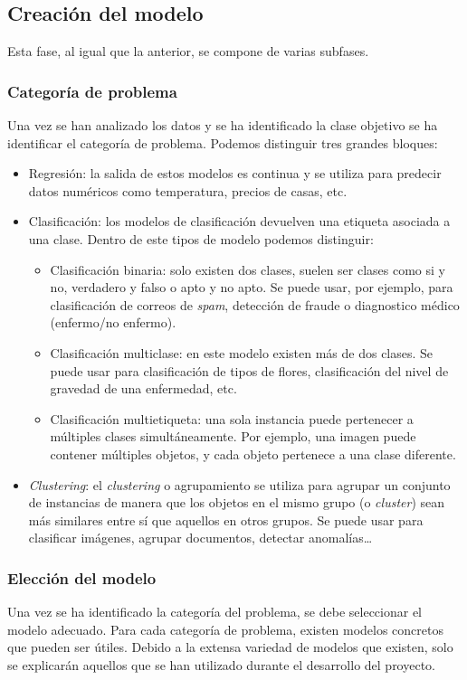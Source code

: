\subsection{Creación del modelo}

Esta fase, al igual que la anterior, se compone de varias subfases.

\subsubsection{Categoría de problema}

Una vez se han analizado los datos y se ha identificado la clase objetivo se ha identificar el categoría de problema. Podemos distinguir tres grandes bloques:
\begin{itemize}
\item Regresión: la salida de estos modelos es continua y se utiliza para predecir datos numéricos como temperatura, precios de casas, etc.
\item Clasificación: los modelos de clasificación devuelven una etiqueta asociada a una clase. Dentro de este tipos de modelo podemos distinguir:
\begin{itemize}
\item Clasificación binaria: solo existen dos clases, suelen ser clases como si y no, verdadero y falso o apto y no apto. Se puede usar, por ejemplo, para clasificación de correos de \textit{spam}, detección de fraude o diagnostico médico (enfermo/no enfermo).
\item Clasificación multiclase: en este modelo existen más de dos clases. Se puede usar para clasificación de tipos de flores, clasificación del nivel de gravedad de una enfermedad, etc.
\item Clasificación multietiqueta: una sola instancia puede pertenecer a múltiples clases simultáneamente. Por ejemplo, una imagen puede contener múltiples objetos, y cada objeto pertenece a una clase diferente.
\end{itemize}
\item \textit{Clustering}: el \textit{clustering} o agrupamiento se utiliza para agrupar un conjunto de instancias de manera que los objetos en el mismo grupo (o \textit{cluster}) sean más similares entre sí que aquellos en otros grupos. Se puede usar para clasificar imágenes, agrupar documentos, detectar anomalías\ldots 

\end{itemize}

\subsubsection{Elección del modelo}
Una vez se ha identificado la categoría del problema, se debe seleccionar el modelo adecuado. Para cada categoría de problema, existen modelos concretos que pueden ser útiles. Debido a la extensa variedad de modelos que existen, solo se explicarán aquellos que se han utilizado durante el desarrollo del proyecto.

